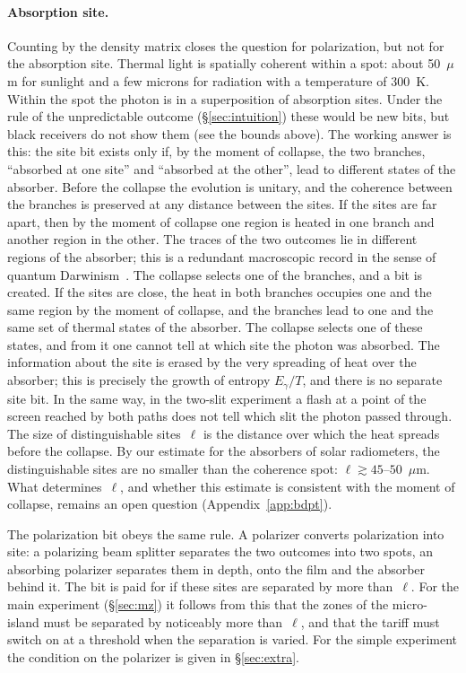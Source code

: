 \documentclass[11pt,a4paper]{article}
\newcommand{\Sref}[1]{\hyperref[#1]{\S\ref{#1}}}
\begin{document}
\paragraph{Absorption site.}
Counting by the density matrix closes the question for polarization, but not for the absorption site. Thermal light is spatially coherent within a spot: about 50~$\mu$m for sunlight and a few microns for radiation with a temperature of 300~K. Within the spot the photon is in a superposition of absorption sites. Under the rule of the unpredictable outcome (\Sref{sec:intuition}) these would be new bits, but black receivers do not show them (see the bounds above). The working answer is this: the site bit exists only if, by the moment of collapse, the two branches, ``absorbed at one site'' and ``absorbed at the other'', lead to different states of the absorber. Before the collapse the evolution is unitary, and the coherence between the branches is preserved at any distance between the sites. If the sites are far apart, then by the moment of collapse one region is heated in one branch and another region in the other. The traces of the two outcomes lie in different regions of the absorber; this is a redundant macroscopic record in the sense of quantum Darwinism~\cite{zurek2009}. The collapse selects one of the branches, and a bit is created. If the sites are close, the heat in both branches occupies one and the same region by the moment of collapse, and the branches lead to one and the same set of thermal states of the absorber. The collapse selects one of these states, and from it one cannot tell at which site the photon was absorbed. The information about the site is erased by the very spreading of heat over the absorber; this is precisely the growth of entropy $E_\gamma/T$, and there is no separate site bit. In the same way, in the two-slit experiment a flash at a point of the screen reached by both paths does not tell which slit the photon passed through. The size of distinguishable sites~$\ell$ is the distance over which the heat spreads before the collapse. By our estimate for the absorbers of solar radiometers, the distinguishable sites are no smaller than the coherence spot: $\ell\gtrsim 45$--$50$~$\mu$m. What determines~$\ell$, and whether this estimate is consistent with the moment of collapse, remains an open question (Appendix~\ref{app:bdpt}).

The polarization bit obeys the same rule. A polarizer converts polarization into site: a polarizing beam splitter separates the two outcomes into two spots, an absorbing polarizer separates them in depth, onto the film and the absorber behind it. The bit is paid for if these sites are separated by more than~$\ell$. For the main experiment (\Sref{sec:mz}) it follows from this that the zones of the micro-island must be separated by noticeably more than~$\ell$, and that the tariff must switch on at a threshold when the separation is varied. For the simple experiment the condition on the polarizer is given in \Sref{sec:extra}.
\end{document}
